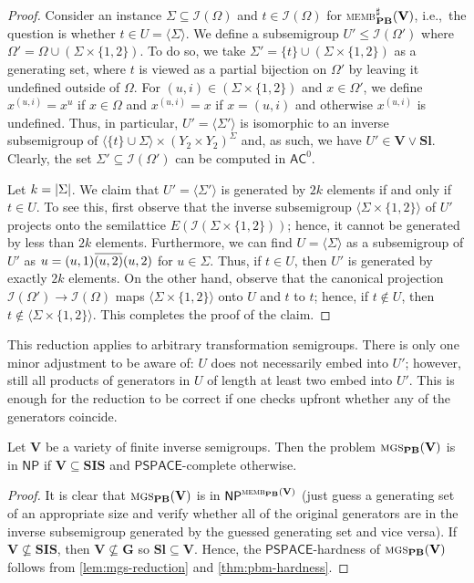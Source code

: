 \documentclass[anonymous,letter,UKenglish,cleveref,autoref,thm-restate]{lipics-v2021}
\renewcommand{\leq}{\leqslant}
\newcommand{\ie}{i.e.,~}
\newcommand{\sse}{\subseteq}
\newcommand{\abs}[1] {\ensuremath\left|#1\right|}
\newcommand{\gen}[1]{\langle #1 \rangle}
\newcommand{\ACz}{\ensuremath{\mathsf{AC}^0}\xspace}
\newcommand{\NP}{\ensuremath{\mathsf{NP}}\xspace}
\newcommand{\PSPACE}{\ensuremath{\mathsf{PSPACE}}\xspace}
\newcommand{\vV}{\ensuremath{\mathbf{V}}}
\newcommand{\vG}{\ensuremath{\mathbf{G}}}
\newcommand{\vSl}{\ensuremath{\mathbf{Sl}}}
\newcommand{\vSI}{\ensuremath{\mathbf{SIS}}}
\newcommand{\ISym}{\cI}
\newcommand\nindent{.5pt}
\newcommand\noverline[1]{\kern\nindent\overline{\kern-\nindent#1\kern-\nindent}\kern\nindent}
\newcommand{\ov}[1]{\noverline{#1}}
\newcommand{\cI}{\mathcal{I}}
\theoremstyle{plain}
\theoremstyle{plain}
\newcommand{\dMemb}[2][]{\textup{\textsc{memb${}_{\mathbf{#1}}\expandafter\ifx\expandafter\relax\detokenize{#2}\relax\else(#2)\fi$}}}
\newcommand{\dMembS}[2][]{\textup{\textsc{memb${}^{\sharp}_{\mathbf{#1}}\expandafter\ifx\expandafter\relax\detokenize{#2}\relax\else(#2)\fi$}}}
\newcommand{\dMGS}[2][]{\textup{\textsc{mgs${}_{\mathbf{#1}}\expandafter\ifx\expandafter\relax\detokenize{#2}\relax\else(#2)\fi$}}}
\begin{document}
\begin{proof}
	Consider an instance $\Sigma \sse \ISym(\Omega)$ and $t \in \ISym(\Omega)$ for \dMembS[PB]{\vV}, \ie the question is whether $t \in U = \gen{\Sigma}$.
  We define a subsemigroup $U' \leq \ISym(\Omega')$ where $\Omega' = \Omega \cup (\Sigma \times \{1,2\})$. 
  To do so, we take $\Sigma' = \{t\} \cup (\Sigma \times \{1,2\})$ as a generating set, where $t$ is viewed as a partial bijection on $\Omega'$ by leaving it undefined outside of $\Omega$.
	For $(u,i) \in (\Sigma \times \{1,2\})$ and $x \in \Omega'$, we define $x^{(u,i)} = x^u$ if $x \in \Omega$ and $x^{(u,i)} = x$ if $x = (u,i)$ and otherwise $x^{(u,i)}$ is undefined.	
  Thus, in particular, $U' = \gen{\Sigma'}$ is isomorphic to an inverse subsemigroup of $\gen{ \{t\} \cup \Sigma} \times (Y_2 \times Y_2)^\Sigma$ and, as such, we have $U' \in \vV \vee \vSl$.
  Clearly, the set $\Sigma' \sse \ISym(\Omega')$ can be computed in $\ACz$.

	Let $k = \abs{\Sigma}$.
	We claim that $U' = \gen{\Sigma'}$ is generated by $2k$ elements if and only if $t \in U$. 
  To see this, first observe that the inverse subsemigroup $\gen{\Sigma \times \{1,2\}}$ of $U'$ projects onto the semilattice $E(\ISym(\Sigma \times \{1,2\}))$; hence, it cannot be generated by less than $2k$ elements. 
	Furthermore, we can find $U = \gen\Sigma$ as a subsemigroup of $U'$ as $u = (u,1) \ov{(u,2)}(u,2)$ for $u \in \Sigma$. 
	Thus, if $t \in U$, then $U'$ is generated by exactly $2k$ elements.
  On the other hand, observe that the canonical projection $\ISym(\Omega') \to \ISym(\Omega)$ maps $\gen{\Sigma \times \{1,2\}}$ onto $U$ and $t$ to $t$; hence, if $t \not \in U$, then $t \not \in \gen{\Sigma \times \{1,2\}}$.
  This completes the proof of the claim.
\end{proof}


\begin{remark}
	This reduction applies to arbitrary transformation semigroups.
	There is only one minor adjustment to be aware of: $U$ does not necessarily embed into $U'$; however, still all products of generators in $U$ of length at least two embed into $U'$.
  This is enough for the reduction to be correct if one checks upfront whether any of the generators coincide.
\end{remark}



\begin{corollary}
	Let $\vV$ be a variety of finite inverse semigroups. 
  Then the problem $\dMGS[PB]{\vV}$ is in \NP if $\vV\sse \vSI$ and \PSPACE-complete otherwise.
\end{corollary}
\begin{proof}
	It is clear that $\dMGS[PB]{\vV}$ is in $\NP^{\dMemb[PB]{\vV}}$ (just guess a generating set of an appropriate size and verify whether all of the original generators are in the inverse subsemigroup generated by the guessed generating set and vice versa). 
	If $\vV \not\sse \vSI$, then $\vV \not\sse \vG$ so $\vSl \sse \vV$.
  Hence, the \PSPACE-hardness of $\dMGS[PB]{\vV}$ follows from \cref{lem:mgs-reduction} and \cref{thm:pbm-hardness}.
\end{proof}
\end{document}
